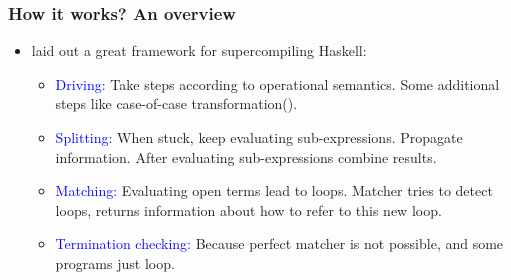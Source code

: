 \documentclass{beamer}
\begin{document}
\begin{frame}
    \frametitle{How it works? An overview}

    \begin{itemize}
        \item[]
            \citet{callbyneed-sc} laid out a great framework for
            supercompiling Haskell:
            \begin{itemize}[<+(1)->]
                \item
                    \textcolor{blue}{Driving:} Take steps according to operational
                    semantics.  Some additional steps like case-of-case
                    transformation(\citet{Jones98atransformation-based}).
                \item
                    \textcolor{blue}{Splitting:} When stuck, keep evaluating
                    sub-expressions. Propagate information. After evaluating
                    sub-expressions combine results.
                \item
                    \textcolor{blue}{Matching:} Evaluating open terms lead to loops.
                    Matcher tries to detect loops, returns information about how
                    to refer to this new loop.
                \item
                    \textcolor{blue}{Termination checking:} Because perfect matcher is
                    not possible, and some programs just loop.
            \end{itemize}
    \end{itemize}
\end{frame}

{
    
}
\end{document}
